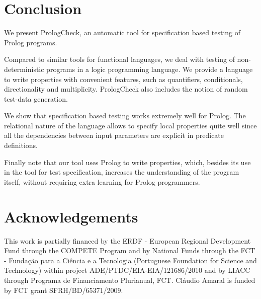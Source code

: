 \documentclass[runningheads,a4paper]{llncs}
\newcommand{\Prolog}[0]{{\sf Prolog}}
\newcommand{\plqc}[0]{{\sf PrologCheck}}
\begin{document}





\section{Conclusion}
\label{sec:conclusion}


We present \plqc{}, an automatic tool for specification based
testing of \Prolog{} programs.


Compared to similar tools for functional languages, we deal with testing
of non-deterministic programs in a logic programming language.
%
We provide a language to write properties with convenient features,
such as quantifiers, conditionals, directionality and multiplicity.
%
\plqc{} also includes the notion of random test-data generation.


We show that specification based testing works extremely well for
\Prolog.
%
The relational nature of the language allows to specify local properties
quite well since all the dependencies between input parameters are explicit in
predicate definitions.


Finally note that our tool uses \Prolog{} to write properties, which,
besides its use in the tool for test specification, increases the
understanding of the program itself, without requiring extra learning for
\Prolog{} programmers.

\section*{Acknowledgements}
This work is partially financed by the ERDF - European Regional
Development Fund through the COMPETE Program and by National Funds through the FCT - Funda\c c\~ao
para a Ci\^encia e a Tecnologia (Portuguese Foundation for Science and
Technology) within project ADE/PTDC/EIA-EIA/121686/2010
%
and by LIACC through Programa de Financiamento
Plurianual, FCT.
%
%
Cl\'audio Amaral is funded by FCT grant SFRH/BD/65371/2009.



\end{document}
